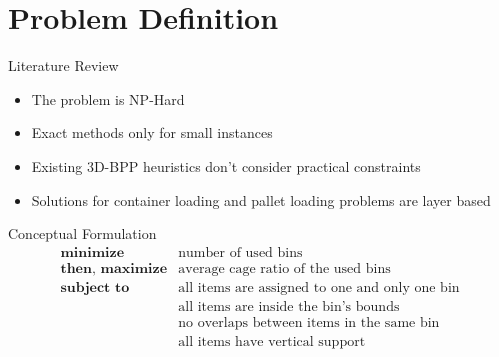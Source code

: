 \documentclass{beamer}
\begin{document}
    \section{Problem Definition}
    \begin{frame}{Literature Review}
        \begin{itemize}
            \item The problem is NP-Hard
            \item Exact methods only for small instances %
            \item Existing 3D-BPP heuristics don't consider practical constraints
            \item Solutions for container loading and pallet loading problems are layer based
        \end{itemize}
    \end{frame}

    \begin{frame}{Conceptual Formulation}
        \begin{eqnarray*}
            \textbf{minimize} & \text{number of used bins} \\
            \textbf{then, maximize} & \text{average cage ratio of the used bins} \\
            \textbf{subject to} & \text{all items are assigned to one and only one bin} \\
                                              & \text{all items are inside the bin's bounds} \\
                                              & \text{no overlaps between items in the same bin} \\
                                              & \text{all items have vertical support} \\
        \end{eqnarray*}
    \end{frame}
\end{document}
